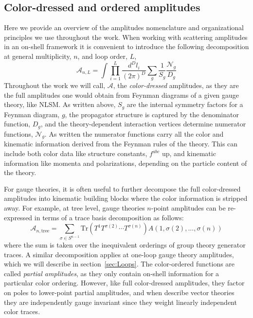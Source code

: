 \documentclass[12pt,letter]{article}
\def\sect#1{section~\ref{#1}}
\def\be{\begin{equation}}
\def\ee{\end{equation}}
\begin{document}
\subsection{Color-dressed and ordered amplitudes}
Here we provide an overview of the amplitudes nomenclature and organizational principles we use throughout the work. When working with scattering amplitudes in an on-shell framework it is convenient to introduce the following decomposition at general multiplicity, $n$, and loop order, $L$,
\be\label{fullAmp}
\mathcal{A}_{n,L} = \int \prod_{i=1}^L\frac{d^D l_i}{(2\pi)^D} \sum_{g} \frac{1}{S_g}\frac{\mathcal{N}_g}{D_g}
\ee
Throughout the work we will call, $\mathcal{A}$, the \textit{color-dressed} amplitudes, as they are the full amplitudes one would obtain from Feynman diagrams of a given gauge theory, like NLSM. As written above, $S_g$ are the internal symmetry factors for a Feynman diagram, $g$, the propagator structure is captured by the denominator function, $D_g$, and the theory-dependent interaction vertices determine numerator functions, $\mathcal{N}_g$. As written the numerator functions carry all the color and kinematic information derived from the Feynman rules of the theory. This can include both color data like structure constants, $f^{abc}$ up, and kinematic information like momenta and polarizations, depending on the particle content of the theory. 

For gauge theories, it is often useful to further decompose the full color-dressed amplitudes into kinematic building blocks where the color information is stripped away. For example, at tree level, gauge theories $n$-point amplitudes can be re-expressed in terms of a trace basis decomposition as follows:
\be
\mathcal{A}_{n,\text{tree}} = \sum_{\sigma \in S^{n-1}} \text{Tr}(T^1 T^{\sigma(2)}\cdots T^{\sigma(n)}) A(1,\sigma(2),...,\sigma(n))
\ee
where the sum is taken over the inequivalent orderings of group theory generator traces. A similar decomposition applies at one-loop gauge theory amplitudes, which we will describe in \sect{sec:Loops}. The color-ordered functions are called \textit{partial amplitudes}, as they only contain on-shell information for a particular color ordering. However, like full color-dressed amplitudes, they factor on poles to lower-point partial amplitudes, and when describe vector theories they are independently gauge invariant since they weight linearly independent color traces. 
\end{document}
